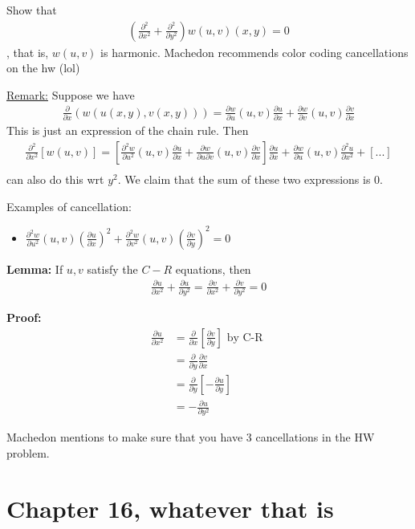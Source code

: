 \documentclass{article}
\newcommand*{\txt}[1]{\text{ #1 }}%
\newcommand*{\partials}[2]{\frac{\partial #1}{\partial #2}}%
\begin{document}
Show that \begin{align*}
    (\frac{\partial^2}{\partial x^2}+\frac{\partial^2}{\partial y^2})w(u,v)(x,y)=0
\end{align*}, that is, $w(u,v)$ is harmonic. Machedon recommends color coding cancellations on the hw (lol)

\underline{Remark:} Suppose we have \begin{align*}
    \frac{\partial}{\partial x}(w(u(x,y),v(x,y)))=\frac{\partial w}{\partial u}(u,v)\frac{\partial u}{\partial x}+\frac{\partial w}{\partial v}(u,v)\frac{\partial v}{\partial x}
\end{align*} This is just an expression of the chain rule. Then \begin{align*}
    \frac{\partial^2}{\partial x^2}[w(u,v)]=[\frac{\partial^2 w}{\partial u^2}(u,v)\frac{\partial u}{\partial x}+\frac{\partial w}{\partial u\partial v}(u,v)\frac{\partial v}{\partial x}]\frac{\partial u}{\partial x}+\frac{\partial w}{\partial u}(u,v)\frac{\partial^2 u}{\partial x^2}+[...]\\
\end{align*} can also do this wrt $y^2$. We claim that the sum of these two expressions is 0.

Examples of cancellation: \begin{itemize}
    \item $\frac{\partial^2 w}{\partial u^2}(u,v)(\frac{\partial u}{\partial x})^2+\frac{\partial^2 w}{\partial v^2}(u,v)(\frac{\partial v}{\partial y})^2=0$
\end{itemize}

\textbf{Lemma:} If $u,v$ satisfy the $C-R$ equations, then \begin{align*}
    \partials{u}{x^2}+\partials{u}{y^2}=\partials{v}{x^2}+\partials{v}{y^2}=0
\end{align*}

\textbf{Proof:} \begin{align*}
    \partials{u}{x^2}&=\partials{}{x}[\partials{v}{y}]\txt{by C-R}\\
    &=\partials{}{y}\partials{v}{x}\\
    &=\partials{}{y}[-\partials{u}{y}]\\
    &=-\partials{u}{y^2}
\end{align*} 

Machedon mentions to make sure that you have 3 cancellations in the HW problem.

\section{Chapter 16, whatever that is}
\end{document}
